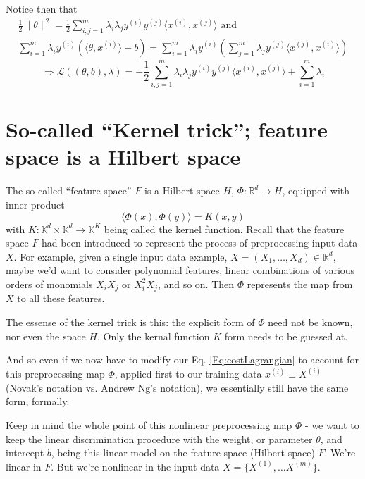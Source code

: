 \documentclass[10pt]{amsart}
\begin{document}
\begin{multicols*}{2}
Notice then that
\begin{equation}
  \begin{gathered} \frac{1}{2} \| \theta \|^2 = \frac{1}{2} \sum_{i,j=1}^m \lambda_i \lambda_j y^{(i)} y^{(j)} \langle x^{(i)}, x^{(j)} \rangle \text{ and } \\
    \sum_{i=1}^m \lambda_i y^{(i)} (\langle \theta, x^{(i)} \rangle -b ) =\sum_{i=1}^m \lambda_i y^{(i)} (\sum_{j=1}^m \lambda_j y^{(j)} \langle x^{(j)}, x^{(i)} \rangle )
    \end{gathered}
  \end{equation}
\begin{equation}
\Longrightarrow \mathcal{L}((\theta,b),\lambda) = -\frac{1}{2} \sum_{i,j=1}^m \lambda_i \lambda_j y^{(i)} y^{(j)} \langle x^{(i)} , x^{(j)} \rangle + \sum_{i=1}^m \lambda_i
\end{equation}

\section{So-called ``Kernel trick''; feature space is a Hilbert space}

The so-called ``feature space'' $F$ is a Hilbert space $H$, $\Phi:\mathbb{R}^d \to H$, equipped with inner product
\begin{equation}
\langle \Phi(x), \Phi(y) \rangle = K(x,y)
  \end{equation}
with $K: \mathbb{K}^d\times \mathbb{K}^d \to \mathbb{K}^K$ being called the kernel function.  Recall that the feature space $F$ had been introduced to represent the process of preprocessing input data $X$.  For example, given a single input data example, $X=(X_1,\dots, X_d)\in \mathbb{R}^d$, maybe we'd want to consider polynomial features, linear combinations of various orders of monomials $X_iX_j$ or $X_i^2 X_j$, and so on.  Then $\Phi$ represents the map from $X$ to all these features.

The essense of the kernel trick is this: the explicit form of $\Phi$ need not be known, nor even the space $H$.  Only the kernal function $K$ form needs to be guessed at.  

And so even if we now have to modify our Eq. \ref{Eq:costLagrangian} to account for this preprocessing map $\Phi$, applied first to our training data $x^{(i)} \equiv X^{(i)}$ (Novak's notation vs. Andrew Ng's notation), we essentially still have the same form, formally.

Keep in mind the whole point of this nonlinear preprocessing map $\Phi$ - we want to keep the linear discrimination procedure with the weight, or parameter $\theta$, and intercept $b$, being this linear model on the feature space (Hilbert space) $F$.  We're linear in $F$.  But we're nonlinear in the input data $X=\lbrace X^{(1)},\dots X^{(m)}\rbrace$.


\end{multicols*}
\end{document}
